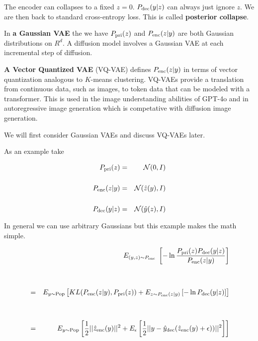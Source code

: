 {\vfill
The encoder can collapses to a fixed $z = 0$. $P_{\mathrm{dec}}(y|z)$ can always just ignore $z$. We are then back to standard cross-entropy loss.
This is called {\bf posterior collapse}.


In {\bf a Gaussian VAE} the we have $P_{\mathrm{pri}}(z)$ and $P_{\mathrm{enc}}(z|y)$ are both Gaussian distributions on $R^d$.
A diffusion model involves a Gaussian VAE at each incremental step of diffusion.

\vfill
{\bf A Vector Quantized VAE} (VQ-VAE) defines $P_{\mathrm{enc}}(z|y)$ in terms of vector quantization analogous to $K$-means clustering.
VQ-VAEs provide a translation from continuous data, such as images, to token data that can be modeled with a transformer.
This is used in the image understanding abilities of GPT-4o and in autoregressive image generation
which is competative with diffusion image generation.

\vfill
We will first consider Gaussian VAEs and discuss VQ-VAEs later.


As an example take

\begin{eqnarray*}
P_{\mathrm{pri}}(z) & = & {\cal N}(0,I) \\
\\
P_{\mathrm{enc}}(z|y) & = & {\cal N}(\hat{z}(y),I) \\
\\
P_{\mathrm{dec}}(y|z) & = & {\cal N}(\hat{y}(z),I)
\end{eqnarray*}

\vfill
In general we can use arbitrary Gaussians but this example makes the math simple.

{\huge
\begin{eqnarray*}
&  & E_{(y,z) \sim P_{\mathrm{enc}}}\;\left[- \ln \frac{P_{\mathrm{pri}}(z)P_{\mathrm{dec}}(y|z)}{P_{\mathrm{enc}}(z|y)}\right] \\
\\
\\
& = & E_{y \sim \mathrm{Pop}} \left[ KL(P_{\mathrm{enc}}(z|y),P_{\mathrm{pri}}(z)) + E_{z \sim P_{\mathrm{enc}}(z|y)}\left[- \ln P_{\mathrm{dec}}(y|z)\right]\right] \\
\\
\\
&=& E_{y \sim \mathrm{Pop}} \left[\frac{1}{2}||\hat{z}_{\mathrm{enc}}(y)||^2 + E_\epsilon\left[\frac{1}{2}||y - \hat{y}_{\mathrm{dec}}(\hat{z}_{\mathrm{enc}}(y)+\epsilon))||^2\right]\right]
\end{eqnarray*}
}



}
